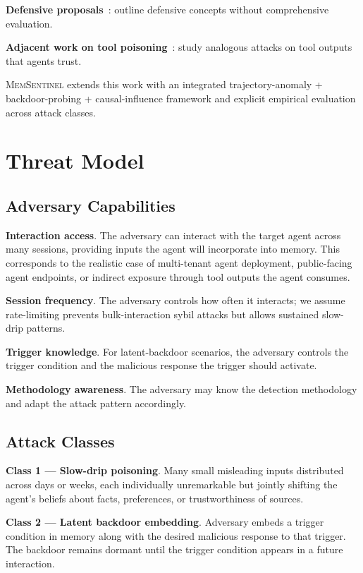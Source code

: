 \documentclass[sigconf,nonacm]{acmart}
\begin{document}
\textbf{Defensive proposals}~\cite{huang2025memshield}: outline
defensive concepts without comprehensive evaluation.

\textbf{Adjacent work on tool poisoning}~\cite{wang2024toolpoison}:
study analogous attacks on tool outputs that agents trust.

\textsc{MemSentinel} extends this work with an integrated
trajectory-anomaly + backdoor-probing + causal-influence framework
and explicit empirical evaluation across attack classes.

\section{Threat Model}

\subsection{Adversary Capabilities}

\textbf{Interaction access}. The adversary can interact with the
target agent across many sessions, providing inputs the agent will
incorporate into memory. This corresponds to the realistic case of
multi-tenant agent deployment, public-facing agent endpoints, or
indirect exposure through tool outputs the agent consumes.

\textbf{Session frequency}. The adversary controls how often it
interacts; we assume rate-limiting prevents bulk-interaction sybil
attacks but allows sustained slow-drip patterns.

\textbf{Trigger knowledge}. For latent-backdoor scenarios, the
adversary controls the trigger condition and the malicious response
the trigger should activate.

\textbf{Methodology awareness}. The adversary may know the
detection methodology and adapt the attack pattern accordingly.

\subsection{Attack Classes}

\textbf{Class 1 --- Slow-drip poisoning}. Many small misleading
inputs distributed across days or weeks, each individually
unremarkable but jointly shifting the agent's beliefs about facts,
preferences, or trustworthiness of sources.

\textbf{Class 2 --- Latent backdoor embedding}. Adversary embeds a
trigger condition in memory along with the desired malicious response
to that trigger. The backdoor remains dormant until the trigger
condition appears in a future interaction.
\end{document}
